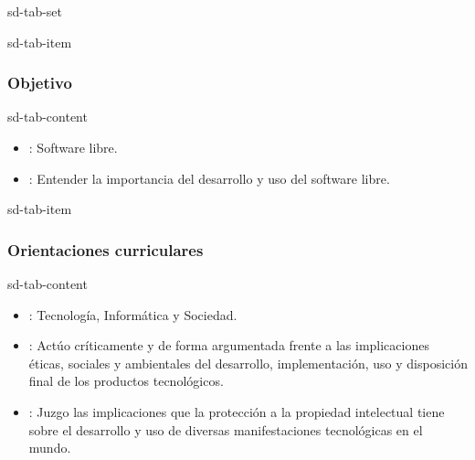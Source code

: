 \documentclass[letterpaper,10pt,spanish]{sphinxmanual}
\begin{document}
\begin{sphinxuseclass}{sd-tab-set}
\begin{sphinxuseclass}{sd-tab-item}\subsubsection*{Objetivo}

\begin{sphinxuseclass}{sd-tab-content}
\sphinxAtStartPar
{}
\begin{itemize}
\item {} 
\sphinxAtStartPar
{}: Software libre.

\item {} 
\sphinxAtStartPar
{}: Entender la importancia del desarrollo y uso del software libre.

\end{itemize}

\end{sphinxuseclass}
\end{sphinxuseclass}
\begin{sphinxuseclass}{sd-tab-item}\subsubsection*{Orientaciones curriculares}

\begin{sphinxuseclass}{sd-tab-content}\begin{itemize}
\item {} 
\sphinxAtStartPar
{}: Tecnología, Informática y Sociedad.

\item {} 
\sphinxAtStartPar
{}: Actúo críticamente y de forma argumentada frente a las implicaciones éticas, sociales y ambientales del desarrollo, implementación, uso y disposición final de los productos tecnológicos.

\item {} 
\sphinxAtStartPar
{}: Juzgo las implicaciones que la protección a la propiedad intelectual tiene sobre el desarrollo y uso de diversas manifestaciones tecnológicas en el mundo.


\end{itemize}
\end{sphinxuseclass}
\end{sphinxuseclass}
\end{sphinxuseclass}
\end{document}

